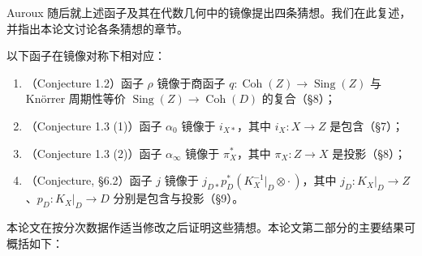 
Auroux 随后就上述函子及其在代数几何中的镜像提出四条猜想。我们在此复述，并指出本论文讨论各条猜想的章节。

\begin{conjecture}[{[Aur18]}]\label{conj:aur-funct}
以下函子在镜像对称下相对应：
\begin{enumerate}
\item （Conjecture 1.2）函子 $\rho$ 镜像于商函子 $q\colon\operatorname{Coh}(Z)\to\operatorname{Sing}(Z)$ 与 Kn{\"o}rrer 周期性等价 $\operatorname{Sing}(Z)\to\operatorname{Coh}(D)$ 的复合（§8）；
\item （Conjecture 1.3 (1)）函子 $\alpha_0$ 镜像于 $i_{X*}$，其中 $i_X\colon X\to Z$ 是包含（§7）；
\item （Conjecture 1.3 (2)）函子 $\alpha_\infty$ 镜像于 $\pi_X^*$，其中 $\pi_X\colon Z\to X$ 是投影（§8）；
\item （Conjecture, §6.2）函子 $j$ 镜像于 $j_{D*}p_D^*(K_X^{-1}|_D\otimes\cdot\,)$，其中 $j_D\colon K_X|_D\to Z$、$p_D\colon K_X|_D\to D$ 分别是包含与投影（§9）。
\end{enumerate}
\end{conjecture}


本论文在按分次数据作适当修改之后证明这些猜想。本论文第二部分的主要结果可概括如下：

